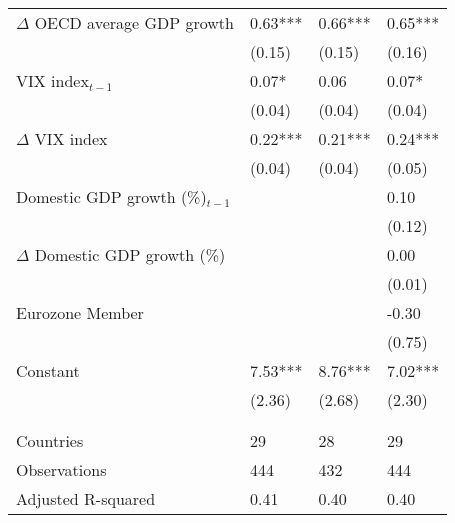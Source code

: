 {\begin{tabular}{lp{2cm}p{2cm}p{2cm}}
  $\Delta$ OECD average GDP growth & 0.63*** & 0.66*** & 0.65*** \\ 
   & (0.15) & (0.15) & (0.16) \\ 
  VIX index$_{t-1}$ & 0.07* & 0.06 & 0.07* \\ 
   & (0.04) & (0.04) & (0.04) \\ 
  $\Delta$ VIX index & 0.22*** & 0.21*** & 0.24*** \\ 
   & (0.04) & (0.04) & (0.05) \\ 
  Domestic GDP growth (\%)$_{t-1}$ &  &  & 0.10 \\ 
   &  &  & (0.12) \\ 
  $\Delta$ Domestic GDP growth (\%) &  &  & 0.00 \\ 
   &  &  & (0.01) \\ 
  Eurozone Member &  &  & -0.30 \\ 
   &  &  & (0.75) \\ 
  Constant & 7.53*** & 8.76*** & 7.02*** \\ 
   & (2.36) & (2.68) & (2.30) \\ 
   &  &  &  \\ 
   &  &  &  \\ 
  Countries & 29 & 28 & 29 \\ 
  Observations & 444 & 432 & 444 \\ 
  Adjusted R-squared & 0.41 & 0.40 & 0.40 \\ 
   \hline
\end{tabular}
}
